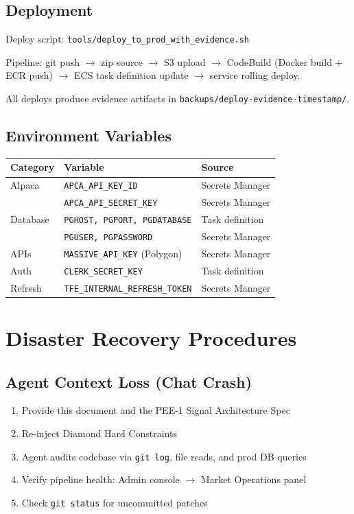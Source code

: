 \documentclass[11pt, a4paper]{article}
\begin{document}
\subsection{Deployment}

Deploy script: \texttt{tools/deploy\_to\_prod\_with\_evidence.sh}

Pipeline: git push $\to$ zip source $\to$ S3 upload $\to$ CodeBuild (Docker build + ECR push) $\to$ ECS task definition update $\to$ service rolling deploy.

All deploys produce evidence artifacts in \texttt{backups/deploy-evidence-{timestamp}/}.

\subsection{Environment Variables}

\begin{center}
\begin{tabular}{@{}lll@{}}
\toprule
\textbf{Category} & \textbf{Variable} & \textbf{Source} \\
\midrule
Alpaca & \texttt{APCA\_API\_KEY\_ID} & Secrets Manager \\
       & \texttt{APCA\_API\_SECRET\_KEY} & Secrets Manager \\
Database & \texttt{PGHOST, PGPORT, PGDATABASE} & Task definition \\
         & \texttt{PGUSER, PGPASSWORD} & Secrets Manager \\
APIs & \texttt{MASSIVE\_API\_KEY} (Polygon) & Secrets Manager \\
Auth & \texttt{CLERK\_SECRET\_KEY} & Task definition \\
Refresh & \texttt{TFE\_INTERNAL\_REFRESH\_TOKEN} & Secrets Manager \\
\bottomrule
\end{tabular}
\end{center}

\section{Disaster Recovery Procedures}

\subsection{Agent Context Loss (Chat Crash)}

\begin{enumerate}
  \item Provide this document and the PEE-1 Signal Architecture Spec
  \item Re-inject Diamond Hard Constraints
  \item Agent audits codebase via \texttt{git log}, file reads, and prod DB queries
  \item Verify pipeline health: Admin console $\to$ Market Operations panel
  \item Check \texttt{git status} for uncommitted patches
\end{enumerate}
\end{document}

